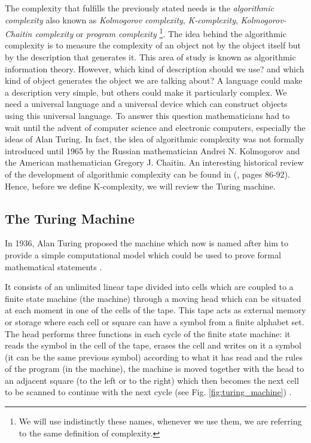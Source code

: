 The complexity that fulfills the previously stated needs is the \textit{algorithmic complexity} also known as \textit{Kolmogorov complexity}, \textit{K-complexity}, \textit{Kolmogorov-Chaitin complexity} or \textit{program complexity} \footnote{We will use indistinctly these names, whenever we use them, we are referring to the same definition of complexity.}. The idea behind the algorithmic complexity is to measure the complexity of an object not by the object itself but by the description that generates it. This area of study is known as algorithmic information theory. However, which kind of description should we use? and which kind of object generates the object we are talking about? A language could make a description very simple, but others could make it particularly complex. We need a universal language and a universal device which can construct objects using this universal language. To answer this question mathematicians had to wait until the advent of computer science and electronic computers, especially the ideas of Alan Turing. In fact, the idea of algorithmic complexity was not formally introduced until 1965 by the Russian mathematician Andrei N. Kolmogorov and the American mathematician Gregory J. Chaitin. An interesting historical review of the development of algorithmic complexity can be found in (\cite{kolmo_book}, pages 86-92). Hence, before we define K-complexity, we will review the Turing machine.

\subsection{The Turing Machine}
In 1936, Alan Turing proposed the machine which now is named after him to provide a simple computational model which could be used to prove formal mathematical statements \cite{hopcroft}.

It consists of an unlimited linear tape divided into cells which are coupled to a finite state machine (the machine) through a moving head which can be situated at each moment in one of the cells of the tape. This tape acts as external memory or storage where each cell or square can have a symbol from a finite alphabet set. The head performs three functions in each cycle of the finite state machine: it reads the symbol in the cell of the tape, erases the cell and writes on it a symbol (it can be the same previous symbol) according to what it has read and the rules of the program (in the machine), the machine is moved together with the head to an adjacent square (to the left or to the right) which then becomes the next cell to be scanned to continue with the next cycle (see Fig. \ref{fig:turing_machine}) \cite{marvin}.

